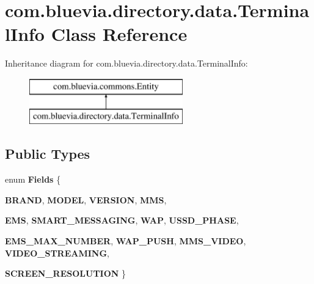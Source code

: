 \hypertarget{classcom_1_1bluevia_1_1directory_1_1data_1_1TerminalInfo}{
\section{com.bluevia.directory.data.TerminalInfo Class Reference}
\label{classcom_1_1bluevia_1_1directory_1_1data_1_1TerminalInfo}
}
Inheritance diagram for com.bluevia.directory.data.TerminalInfo:\begin{figure}[H]
\begin{center}
\leavevmode
\includegraphics[height=2.000000cm]{classcom_1_1bluevia_1_1directory_1_1data_1_1TerminalInfo}
\end{center}
\end{figure}
\subsection*{Public Types}
\begin{DoxyCompactItemize}
\item 
enum {\bfseries Fields} \{ \par
{\bfseries BRAND}, 
{\bfseries MODEL}, 
{\bfseries VERSION}, 
{\bfseries MMS}, 
\par
{\bfseries EMS}, 
{\bfseries SMART\_\-MESSAGING}, 
{\bfseries WAP}, 
{\bfseries USSD\_\-PHASE}, 
\par
{\bfseries EMS\_\-MAX\_\-NUMBER}, 
{\bfseries WAP\_\-PUSH}, 
{\bfseries MMS\_\-VIDEO}, 
{\bfseries VIDEO\_\-STREAMING}, 
\par
{\bfseries SCREEN\_\-RESOLUTION}
 \}
\end{DoxyCompactItemize}
